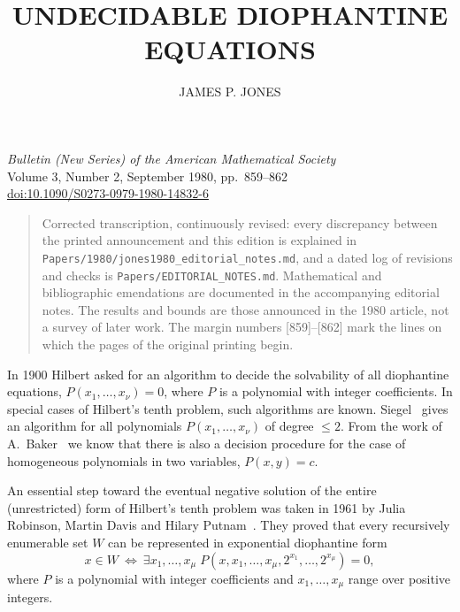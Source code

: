\documentclass[11pt,letterpaper]{article}
\title{\vspace{-1.5em}\Large\bfseries UNDECIDABLE DIOPHANTINE EQUATIONS}
\author{\normalsize JAMES P. JONES}
\date{}
\newcommand{\origpage}[1]{\marginnote{\footnotesize\textbf{[#1]}}}
\let\origpagemark\origpage
\begin{document}
\maketitle
\thispagestyle{plain}
\vspace{-1.8em}
\begin{center}
\small \textit{Bulletin (New Series) of the American Mathematical Society}\\
Volume 3, Number 2, September 1980, pp.\ 859--862\\
\href{https://doi.org/10.1090/S0273-0979-1980-14832-6}{doi:10.1090/S0273-0979-1980-14832-6}
\end{center}
\vspace{-0.5em}
\begin{quote}\footnotesize
Corrected transcription, continuously revised: every discrepancy between the printed announcement and this edition is explained in \texttt{Papers/1980/}\allowbreak\texttt{jones1980\_editorial\_notes.md}, and a dated log of revisions and checks is \texttt{Papers/EDITORIAL\_NOTES.md}. Mathematical and bibliographic
emendations are documented in the accompanying editorial notes. The results
and bounds are those announced in the 1980 article, not a survey of later work.
The margin numbers [859]--[862] mark the lines on which the pages of the
original printing begin.
\end{quote}

\origpagemark{859}In 1900 Hilbert asked for an algorithm to decide the solvability of all
diophantine equations, $P(x_1,\ldots,x_\nu)=0$, where $P$ is a polynomial
with integer coefficients. In special cases of Hilbert's tenth problem,
such algorithms are known. Siegel~\cite{Siegel} gives an algorithm for all
polynomials $P(x_1,\ldots,x_\nu)$ of degree $\leqslant 2$. From the work of
A.~Baker~\cite{Baker} we know that there is also a decision procedure for
the case of homogeneous polynomials in two variables, $P(x,y)=c$.

An essential step toward the eventual negative solution of the entire
(unrestricted) form of Hilbert's tenth problem was taken in 1961 by Julia
Robinson, Martin Davis and Hilary Putnam~\cite{DPR}. They proved that every
recursively enumerable set $W$ can be represented in exponential
diophantine form
\[
 x\in W\ \Longleftrightarrow\
 \exists x_1,\ldots,x_\mu\;
 P(x,x_1,\ldots,x_\mu,2^{x_1},\ldots,2^{x_\mu})=0,
\]
where $P$ is a polynomial with integer coefficients and $x_1,\ldots,x_\mu$
range over positive integers.
\end{document}
